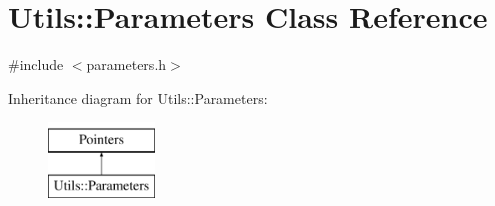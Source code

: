\hypertarget{classUtils_1_1Parameters}{}\section{Utils\+:\+:Parameters Class Reference}
\label{classUtils_1_1Parameters}


{\ttfamily \#include $<$parameters.\+h$>$}

Inheritance diagram for Utils\+:\+:Parameters\+:\begin{figure}[H]
\begin{center}
\leavevmode
\includegraphics[height=2.000000cm]{classUtils_1_1Parameters}
\end{center}
\end{figure}
